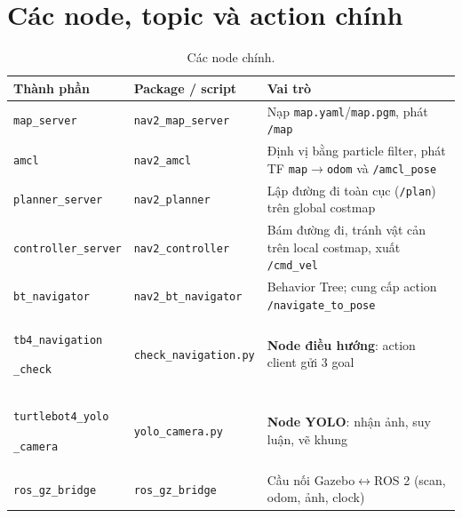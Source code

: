\documentclass[a4paper,12pt]{article}
\newcommand{\rospkg}[1]{\texttt{#1}}
\begin{document}
\section{Các node, topic và action chính}
\begin{table}[htbp]
\centering\small
\begin{tabular}{@{}p{3.6cm}p{4.4cm}p{7.6cm}@{}}
\toprule
\textbf{Thành phần} & \textbf{Package / script} & \textbf{Vai trò} \\\midrule
\texttt{map\_server} & \rospkg{nav2\_map\_server} & Nạp \texttt{map.yaml}/\texttt{map.pgm}, phát \texttt{/map} \\
\texttt{amcl} & \rospkg{nav2\_amcl} & Định vị bằng particle filter, phát TF \texttt{map}$\to$\texttt{odom} và \texttt{/amcl\_pose} \\
\texttt{planner\_server} & \rospkg{nav2\_planner} & Lập đường đi toàn cục (\texttt{/plan}) trên global costmap \\
\texttt{controller\_server} & \rospkg{nav2\_controller} & Bám đường đi, tránh vật cản trên local costmap, xuất \texttt{/cmd\_vel} \\
\texttt{bt\_navigator} & \rospkg{nav2\_bt\_navigator} & Behavior Tree; cung cấp action \texttt{/navigate\_to\_pose} \\
\texttt{tb4\_navigation}\par\texttt{\_check} & \texttt{check\_navigation.py} & \textbf{Node điều hướng}: action client gửi 3 goal \\
\texttt{turtlebot4\_yolo}\par\texttt{\_camera} & \texttt{yolo\_camera.py} & \textbf{Node YOLO}: nhận ảnh, suy luận, vẽ khung \\
\texttt{ros\_gz\_bridge} & \rospkg{ros\_gz\_bridge} & Cầu nối Gazebo$\leftrightarrow$ROS 2 (scan, odom, ảnh, clock) \\\bottomrule
\end{tabular}
\caption{Các node chính.}
\end{table}
\end{document}
